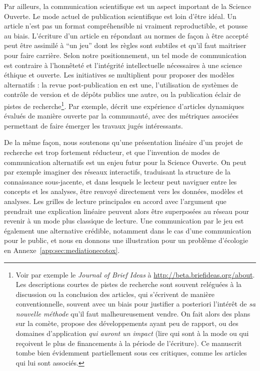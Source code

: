 Par ailleurs, la communication scientifique est un aspect important de la Science Ouverte. Le mode actuel de publication scientifique est loin d'être idéal. Un article n'est pas un format compréhensible ni vraiment reproductible, et pousse au biais. L'écriture d'un article en répondant au normes de façon à être accepté peut être assimilé à ``un jeu'' dont les règles sont subtiles et qu'il faut maitriser pour faire carrière. Selon notre positionnement, un tel mode de communication est contraire à l'honnêteté et l'intégrité intellectuelle nécessaires à une science éthique et ouverte. Les initiatives se multiplient pour proposer des modèles alternatifs : la revue post-publication en est une, l'utilisation de systèmes de contrôle de version et de dépôts publics une autre, ou la publication éclair de pistes de recherche\footnote{Voir par exemple le \emph{Journal of Brief Ideas} à \url{http://beta.briefideas.org/about}. Les descriptions courtes de pistes de recherche sont souvent reléguées à la discussion ou la conclusion des articles, qui s'écrivent de manière conventionnelle, souvent avec un biais pour justifier a posteriori l'intérêt de \emph{sa nouvelle méthode} qu'il faut malheureusement vendre. On fait alors des plans sur la comète, propose des développements ayant peu de rapport, ou des domaines d'application \emph{qui auront un impact} (lire qui sont à la mode ou qui reçoivent le plus de financements à la période de l'écriture). Ce manuscrit tombe bien évidemment partiellement sous ces critiques, comme les articles qui lui sont associés.}. Par exemple, \cite{bon2017novel} décrit une expérience d'articles dynamiques évalués de manière ouverte par la communauté, avec des métriques associées permettant de faire émerger les travaux jugés intéressants.



De la même façon, nous soutenons qu'une présentation linéaire d'un projet de recherche est trop fortement réducteur, et que l'invention de modes de communication alternatifs est un enjeu futur pour la Science Ouverte. On peut par exemple imaginer des réseaux interactifs, traduisant la structure de la connaissance sous-jacente, et dans lesquels le lecteur peut naviguer entre les concepts et les analyses, être renvoyé directement vers les données, modèles et analyses. Les grilles de lecture principales en accord avec l'argument que prendrait une explication linéaire peuvent alors être superposées au réseau pour revenir à un mode plus classique de lecture. Une communication par le jeu est également une alternative crédible, notamment dans le cas d'une communication pour le public, et nous en donnons une illustration pour un problème d'écologie en Annexe~\ref{app:sec:mediationecotox}.


